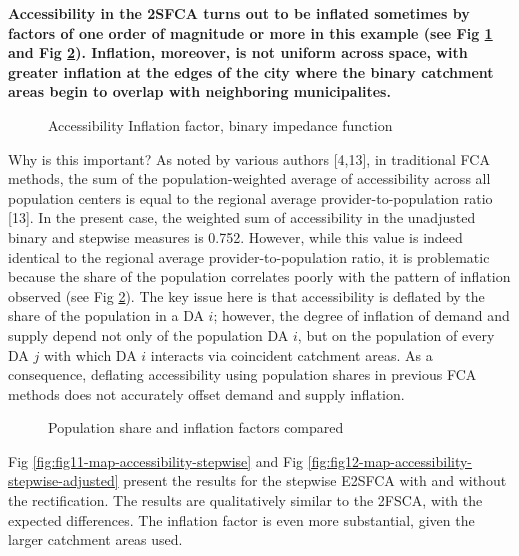\documentclass[10pt,letterpaper]{article}
\begin{document}
\textbf{Accessibility in the 2SFCA turns out to be inflated sometimes by
factors of one order of magnitude or more in this example (see Fig
\ref{fig:fig9-map-accessibility-binary-comparison} and Fig
\ref{fig:fig10-map-pop-share-inflation-comparison-binary}). Inflation,
moreover, is not uniform across space, with greater inflation at the
edges of the city where the binary catchment areas begin to overlap with
neighboring municipalites. }

\begin{figure}[htbp]
\centering
\caption{\label{fig:fig9-map-accessibility-binary-comparison}Accessibility
Inflation factor, binary impedance function}
\end{figure}

Why is this important? As noted by various authors {[}4,13{]}, in
traditional FCA methods, the sum of the population-weighted average of
accessibility across all population centers is equal to the regional
average provider-to-population ratio {[}13{]}. In the present case, the
weighted sum of accessibility in the unadjusted binary and stepwise
measures is 0.752. However, while this value is indeed identical to the
regional average provider-to-population ratio, it is problematic because
the share of the population correlates poorly with the pattern of
inflation observed (see Fig
\ref{fig:fig10-map-pop-share-inflation-comparison-binary}). The key
issue here is that accessibility is deflated by the share of the
population in a DA \(i\); however, the degree of inflation of demand and
supply depend not only of the population DA \(i\), but on the population
of every DA \(j\) with which DA \(i\) interacts via coincident catchment
areas. As a consequence, deflating accessibility using population shares
in previous FCA methods does not accurately offset demand and supply
inflation.

\begin{figure}[htbp]
\centering
\caption{\label{fig:fig10-map-pop-share-inflation-comparison-binary}Population
share and inflation factors compared}
\end{figure}

Fig \ref{fig:fig11-map-accessibility-stepwise} and Fig
\ref{fig:fig12-map-accessibility-stepwise-adjusted} present the results
for the stepwise E2SFCA with and without the rectification. The results
are qualitatively similar to the 2FSCA, with the expected differences.
The inflation factor is even more substantial, given the larger
catchment areas used.
\end{document}
